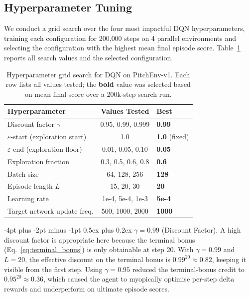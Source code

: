 \documentclass{article}
\makeatletter
\renewcommand\paragraph{\@startsection{paragraph}{4}{\z@}%
  {-4pt plus -2pt minus -1pt}%
  {0.5ex plus 0.2ex}%
  {\normalsize\bf}}
\makeatother
\begin{document}
\FloatBarrier
\subsection{Hyperparameter Tuning}
\label{sec:hyperparams}

We conduct a grid search over the four most impactful
DQN hyperparameters, training each configuration for 200{,}000 steps
on 4 parallel environments and selecting the configuration with the
highest mean final episode score.
Table~\ref{tab:hyperparam_grid} reports all search values and the
selected configuration.

\begin{table}[htbp]
\centering
\caption{Hyperparameter grid search for DQN on PitchEnv-v1.
         Each row lists all values tested; the \textbf{bold} value was
         selected based on mean final score over a 200k-step search run.}
\label{tab:hyperparam_grid}
\small
\begin{tabular}{lcl}
\toprule
\textbf{Hyperparameter} & \textbf{Values Tested} & \textbf{Best} \\
\midrule
Discount factor $\gamma$
  & 0.95, 0.99, 0.999
  & \textbf{0.99} \\
\addlinespace[2pt]
$\varepsilon$-start (exploration start)
  & 1.0
  & \textbf{1.0} (fixed) \\
\addlinespace[2pt]
$\varepsilon$-end (exploration floor)
  & 0.01, 0.05, 0.10
  & \textbf{0.05} \\
\addlinespace[2pt]
Exploration fraction
  & 0.3, 0.5, 0.6, 0.8
  & \textbf{0.6} \\
\addlinespace[2pt]
Batch size
  & 64, 128, 256
  & \textbf{128} \\
\addlinespace[2pt]
Episode length $L$
  & 15, 20, 30
  & \textbf{20} \\
\addlinespace[2pt]
Learning rate
  & 1e-4, 5e-4, 1e-3
  & \textbf{5e-4} \\
\addlinespace[2pt]
Target network update freq.
  & 500, 1000, 2000
  & \textbf{1000} \\
\bottomrule
\end{tabular}
\end{table}

\paragraph{$\gamma = 0.99$ (Discount Factor).}
A high discount factor is appropriate here because the terminal bonus
(Eq.~\ref{eq:terminal_bonus}) is only obtainable at step 20. With
$\gamma = 0.99$ and $L = 20$, the effective discount on the terminal bonus
is $0.99^{20} \approx 0.82$, keeping it visible from the first step.
Using $\gamma = 0.95$ reduced the terminal-bonus credit to $0.95^{20} \approx 0.36$,
which caused the agent to myopically optimise per-step delta rewards and
underperform on ultimate episode scores.
\end{document}

